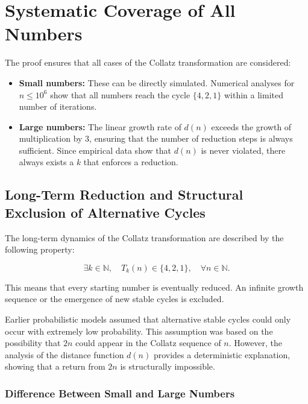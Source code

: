 \documentclass[a4paper,12pt]{article}
\begin{document}
\section{Systematic Coverage of All Numbers}

The proof ensures that all cases of the Collatz transformation are considered:

\begin{itemize}
    \item \textbf{Small numbers:} These can be directly simulated. Numerical analyses for \( n \leq 10^6 \) show that all numbers reach the cycle \( \{4, 2, 1\} \) within a limited number of iterations.
    \item \textbf{Large numbers:} The linear growth rate of \( d(n) \) exceeds the growth of multiplication by 3, ensuring that the number of reduction steps is always sufficient. Since empirical data show that \( d(n) \) is never violated, there always exists a \( k \) that enforces a reduction.
\end{itemize}

\subsection{Long-Term Reduction and Structural Exclusion of Alternative Cycles}

The long-term dynamics of the Collatz transformation are described by the following property:

\begin{equation}
    \exists k \in \mathbb{N}, \quad T_k(n) \in \{4,2,1\}, \quad \forall n \in \mathbb{N}.
\end{equation}

This means that every starting number is eventually reduced. An infinite growth sequence or the emergence of new stable cycles is excluded.

Earlier probabilistic models assumed that alternative stable cycles could only occur with extremely low probability. This assumption was based on the possibility that \( 2n \) could appear in the Collatz sequence of \( n \). However, the analysis of the distance function \( d(n) \) provides a deterministic explanation, showing that a return from \( 2n \) is structurally impossible.

\subsubsection{Difference Between Small and Large Numbers}
\end{document}
